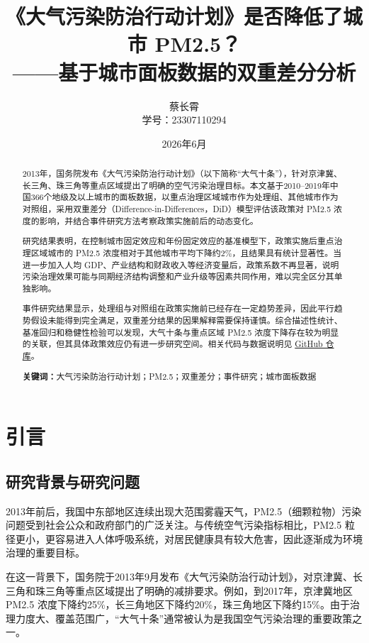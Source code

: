 \documentclass[12pt]{article}
\title{《大气污染防治行动计划》是否降低了城市 PM2.5？\\——基于城市面板数据的双重差分分析}
\author{%
  蔡长霄 \\ 学号：23307110294
}
\date{2026年6月}
\begin{document}
\maketitle

\begin{abstract}
2013年，国务院发布《大气污染防治行动计划》（以下简称``大气十条''），针对京津冀、长三角、珠三角等重点区域提出了明确的空气污染治理目标。本文基于2010--2019年中国366个地级及以上城市的面板数据，以重点治理区域城市作为处理组、其他城市作为对照组，采用双重差分（Difference-in-Differences，DiD）模型评估该政策对 PM2.5 浓度的影响，并结合事件研究方法考察政策实施前后的动态变化。

研究结果表明，在控制城市固定效应和年份固定效应的基准模型下，政策实施后重点治理区域城市的 PM2.5 浓度相对于其他城市平均下降约2\%，且结果具有统计显著性。当进一步加入人均 GDP、产业结构和财政收入等经济变量后，政策系数不再显著，说明污染治理效果可能与同期经济结构调整和产业升级等因素共同作用，难以完全区分其单独影响。

事件研究结果显示，处理组与对照组在政策实施前已经存在一定趋势差异，因此平行趋势假设未能得到完全满足，双重差分结果的因果解释需要保持谨慎。综合描述性统计、基准回归和稳健性检验可以发现，大气十条与重点区域 PM2.5 浓度下降存在较为明显的关联，但其具体政策效应仍有进一步研究空间。相关代码与数据说明见 \href{https://github.com/cedric1902666/Air-Ten-PM25}{GitHub 仓库}。

\noindent\textbf{关键词：}大气污染防治行动计划；PM2.5；双重差分；事件研究；城市面板数据
\end{abstract}

\section{引言}

\subsection{研究背景与研究问题}

2013年前后，我国中东部地区连续出现大范围雾霾天气，PM2.5（细颗粒物）污染问题受到社会公众和政府部门的广泛关注。与传统空气污染指标相比，PM2.5 粒径更小，更容易进入人体呼吸系统，对居民健康具有较大危害，因此逐渐成为环境治理的重要目标。

在这一背景下，国务院于2013年9月发布《大气污染防治行动计划》，对京津冀、长三角和珠三角等重点区域提出了明确的减排要求。例如，到2017年，京津冀地区 PM2.5 浓度下降约25\%，长三角地区下降约20\%，珠三角地区下降约15\%。由于治理力度大、覆盖范围广，``大气十条''通常被认为是我国空气污染治理的重要政策之一。
\end{document}
